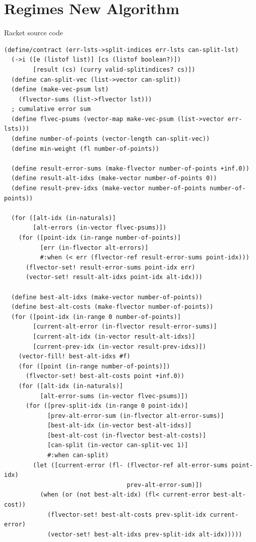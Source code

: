 \documentclass{article}
\begin{document}
\section{Regimes New Algorithm}
Racket source code
\label{appendix:new-algorithm} 
\begin{lstlisting}
(define/contract (err-lsts->split-indices err-lsts can-split-lst)
  (->i ([e (listof list)] [cs (listof boolean?)]) 
        [result (cs) (curry valid-splitindices? cs)])
  (define can-split-vec (list->vector can-split))
  (define (make-vec-psum lst)
    (flvector-sums (list->flvector lst)))
  ; cumulative error sum
  (define flvec-psums (vector-map make-vec-psum (list->vector err-lsts)))
  (define number-of-points (vector-length can-split-vec))
  (define min-weight (fl number-of-points))
  
  (define result-error-sums (make-flvector number-of-points +inf.0))
  (define result-alt-idxs (make-vector number-of-points 0))
  (define result-prev-idxs (make-vector number-of-points number-of-points))
  
  (for ([alt-idx (in-naturals)]
        [alt-errors (in-vector flvec-psums)])
    (for ([point-idx (in-range number-of-points)]
          [err (in-flvector alt-errors)]
          #:when (< err (flvector-ref result-error-sums point-idx)))
      (flvector-set! result-error-sums point-idx err)
      (vector-set! result-alt-idxs point-idx alt-idx)))

  (define best-alt-idxs (make-vector number-of-points))
  (define best-alt-costs (make-flvector number-of-points))
  (for ([point-idx (in-range 0 number-of-points)]
        [current-alt-error (in-flvector result-error-sums)]
        [current-alt-idx (in-vector result-alt-idxs)]
        [current-prev-idx (in-vector result-prev-idxs)])
    (vector-fill! best-alt-idxs #f)
    (for ([point (in-range number-of-points)])
      (flvector-set! best-alt-costs point +inf.0))
    (for ([alt-idx (in-naturals)]
          [alt-error-sums (in-vector flvec-psums)])
      (for ([prev-split-idx (in-range 0 point-idx)]
            [prev-alt-error-sum (in-flvector alt-error-sums)]
            [best-alt-idx (in-vector best-alt-idxs)]
            [best-alt-cost (in-flvector best-alt-costs)]
            [can-split (in-vector can-split-vec 1)]
            #:when can-split)
        (let ([current-error (fl- (flvector-ref alt-error-sums point-idx) 
                                  prev-alt-error-sum)])
          (when (or (not best-alt-idx) (fl< current-error best-alt-cost))
            (flvector-set! best-alt-costs prev-split-idx current-error)
            (vector-set! best-alt-idxs prev-split-idx alt-idx)))))


\end{lstlisting}
\end{document}

